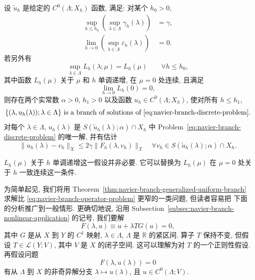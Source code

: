 \setcounter{statement}{6}
\begin{Theorem}\label{thm:navier-branch-generalized-uniform-branch}
设 $\widetilde u_h$ 是给定的 $C^0(\Lambda;X_h)$ 函数, 满足: 对某个 $h_0>0$,
\begin{align}
\sup_{h\leq h_0}\left(\sup_{\lambda\in\Lambda}\gamma_h(\lambda)\right)
&=\gamma,
\tag{3.26$'$}\label{eq:navier-branch-generalized-uniform-gamma}\\
\lim_{h\to0}\left(\sup_{\lambda\in\Lambda}\varepsilon_h(\lambda)\right)&=0.
\tag{3.27$'$}\label{eq:navier-branch-generalized-uniform-residual}
\end{align}
若另外有
\setcounter{equation}{55}
\begin{equation}\label{eq:navier-branch-generalized-uniform-lipschitz}
\sup_{\lambda\in\Lambda}L_h(\lambda;\mu)=L_h(\mu)
\qquad\forall h\leq h_0,
\end{equation}
其中函数 $L_h(\mu)$ 关于 $\mu$ 和 $h$ 单调递增, 在 $\mu=0$ 处连续, 且满足
\begin{equation}\label{eq:navier-branch-generalized-zero-limit}
\lim_{h\to0}L_h(0)=0,
\end{equation}
则存在两个实常数 $\alpha>0$, $h_1>0$ 以及函数
$u_h\in C^0(\Lambda;X_h)$, 使对所有 $h\leq h_1$,
\[
\{(\lambda,u_h(\lambda));\lambda\in\Lambda\}
\text{ is a branch of solutions of }
\eqref{eq:navier-branch-discrete-problem}.
\]
对每个 $\lambda\in\Lambda$, $u_h(\lambda)$ 是
$S(\widetilde u_h(\lambda);\alpha)\cap X_h$ 中
Problem~\eqref{eq:navier-branch-discrete-problem} 的唯一解, 并有估计
\begin{equation}\tag{3.30$'$}\label{eq:navier-branch-generalized-uniform-error}
\|u_h(\lambda)-v_h\|_X
\leq2\gamma\|F_h(\lambda,v_h)\|_{\mathscr X}
\quad\forall v_h\in S(\widetilde u_h(\lambda);\alpha)\cap X_h.
\end{equation}
\end{Theorem}

\setcounter{statement}{7}
\begin{Remark}\label{rem:navier-branch-generalized-uniformity-in-h}
$L_h(\mu)$ 关于 $h$ 单调递增这一假设并非必要. 它可以替换为
$L_h(\mu)$ 在 $\mu=0$ 处关于 $h$ 一致连续这一条件.
\end{Remark}

为简单起见, 我们将用 Theorem~\ref{thm:navier-branch-generalized-uniform-branch}
求解比 \eqref{eq:navier-branch-operator-problem} 更窄的一类问题, 但读者容易把
下面的分析推广到一般情形. 更确切地说, 沿用
Subsection~\ref{subsec:navier-branch-nonlinear-application} 的记号, 我们要解
\begin{equation}\tag{3.33$'$}\label{eq:navier-branch-nondifferentiable-model}
F(\lambda,u)\equiv u+\lambda TG(u)=0,
\end{equation}
其中 $G$ 是从 $X$ 到 $Y$ 的 $C^1$ 映射,
$\lambda\in\Lambda$, $\Lambda$ 是 $\mathbb R$ 的紧区间. 算子 $T$ 保持不变,
但假设 $T\in\mathcal L(Y;V)$, 其中 $V$ 是 $X$ 的闭子空间.
这可以理解为对 $T$ 的一个正则性假设. 再假设问题
\[
F(\lambda,u(\lambda))=0
\]
有从 $\Lambda$ 到 $X$ 的非奇异解分支 $\lambda\mapsto u(\lambda)$, 且
$u\in C^0(\Lambda;V)$.

